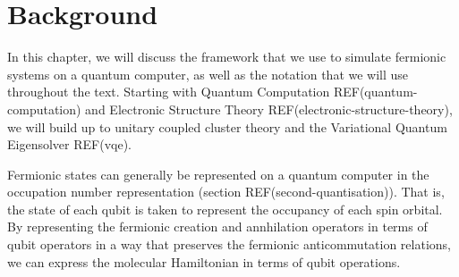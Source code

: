 \chapter{Background}%
\label{background}

In this chapter, we will discuss the framework that we use to simulate fermionic systems on a quantum computer, as well as the notation that we will use throughout the text. Starting with Quantum Computation REF(quantum-computation) and Electronic Structure Theory REF(electronic-structure-theory), we will build up to unitary coupled cluster theory and the Variational Quantum Eigensolver REF(vqe).

Fermionic states can generally be represented on a quantum computer in the occupation number representation (section REF(second-quantisation)). That is, the state of each qubit is taken to represent the occupancy of each spin orbital. By representing the fermionic creation and annhilation operators in terms of qubit operators in a way that preserves the fermionic anticommutation relations, we can express the molecular Hamiltonian in terms of qubit operations.
